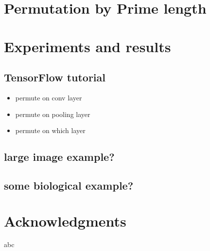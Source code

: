 \documentclass{article}
\begin{document}
\section{Permutation by Prime length}

\section{Experiments and results}

\subsection{TensorFlow tutorial}
\begin{itemize}
	\item permute on conv layer
	\item permute on pooling layer
	\item permute on which layer
\end{itemize}

\subsection{large image example?}

\subsection{some biological example?}

\section*{Acknowledgments}

abc






\end{document}
